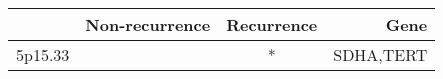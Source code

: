 \begin{tabular}{lccr}
\toprule
{} & Non-recurrence & Recurrence &       Gene \\
\midrule
5p15.33 &                &          * &  SDHA,TERT \\
\bottomrule
\end{tabular}
